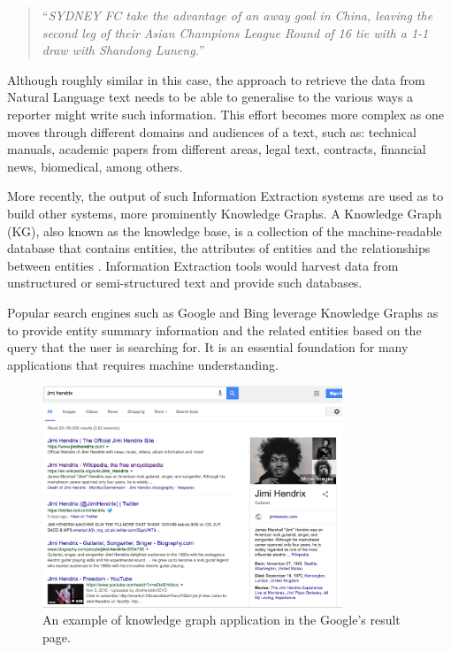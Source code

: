 \documentclass[11pt,a4paper,openright]{memoir}
\begin{document}
\blockquote{\enquote{\emph{SYDNEY FC take the advantage of an away goal in China, leaving the second leg of their Asian Champions League Round of 16 tie with a 1-1 draw with Shandong Luneng.}}}

Although roughly similar in this case, the approach to retrieve the data from Natural Language text needs to be able to generalise to the various ways a reporter might write such information. This effort becomes more complex as one moves through different domains and audiences of a text, such as: technical manuals, academic papers from different areas, legal text, contracts, financial news, biomedical, among others.

More recently, the output of such Information Extraction systems are used as to build other systems, more prominently Knowledge Graphs. A Knowledge Graph (KG), also known as the knowledge base, is a collection of the machine-readable database that contains entities, the attributes of entities and the relationships between entities \cite{google}. Information Extraction tools would harvest data from unstructured or semi-structured text and provide such databases.

Popular search engines such as Google \cite{google} and Bing \cite{bing} leverage Knowledge Graphs as to provide entity summary information and the related entities based on the query that the user is searching for. It is an essential foundation for many applications that requires machine understanding.

\begin{figure}[!htbp]
  \centering
    \includegraphics[width=0.8\textwidth]{./images/google_knowledge_graph}
  \caption[An example of knowledge graph application.]{An example of knowledge graph application in the Google's result page.}
  \label{fig:google_knowledge_graph}
\end{figure}
\end{document}
